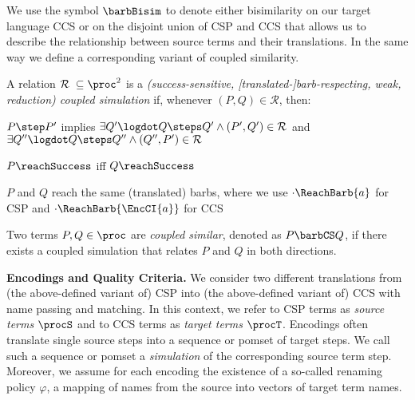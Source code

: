 \documentclass[copyright,creativecommons]{eptcs}
\begin{document}
\noindent
We use the symbol $ \barbBisim $ to denote either bisimilarity on our target language CCS or on the disjoint union of CSP and CCS that allows us to describe the relationship between source terms and their translations. In the same way we define a corresponding variant of coupled similarity.

\begin{definition}
	A relation $ \mathcal{R} \; \subseteq \proc^2 $ is a \emph{(success-sensitive, [translated-]barb-respecting, weak, reduction) coupled simulation} if, whenever $ \left( P, Q \right) \in \mathcal{R} $, then:
	\begin{compactitem}
		\item $ P \step P' $ implies $ \exists Q'\logdot Q \steps Q' \wedge \left( P', Q' \right) \in \mathcal{R} $ and $ \exists Q''\logdot Q \steps Q'' \wedge \left( Q'', P' \right) \in \mathcal{R} $
		\item $ P\reachSuccess $ iff $ Q\reachSuccess $
		\item $ P $ and $ Q $ reach the same (translated) barbs, where we use $ \cdot\ReachBarb{a} $ for CSP and $ \cdot\ReachBarb{\EncCI{a}} $ for CCS
	\end{compactitem}
	Two terms $ P, Q \in \proc $ are \emph{coupled similar}, denoted as $ P \barbCS Q $, if there exists a coupled simulation that relates $ P $ and $ Q $ in both directions.
\end{definition}

\vspace{0.3em}
\noindent
\textbf{Encodings and Quality Criteria.}\;
We consider two different translations from (the above-defined variant of) CSP into (the above-defined variant of) CCS with name passing and matching. 
In this context, we refer to CSP terms as \emph{source terms} $ \procS $ and to CCS terms as \emph{target terms} $ \procT $. 
Encodings often translate single source steps into a sequence or pomset of target steps. We call such a sequence or pomset a \emph{simulation} of the corresponding source term step.
Moreover, we assume for each encoding the existence of a so-called renaming policy $ \varphi $, \ie a mapping of names from the source into vectors of target term names.
\end{document}
